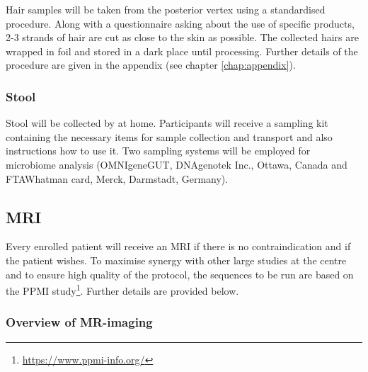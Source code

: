 Hair samples will be taken from the posterior vertex using a standardised procedure. Along with a questionnaire asking about the use of specific products, 2-3 strands of hair are cut as close to the skin as possible. The collected hairs are wrapped in foil and stored in a dark place until processing. Further details of the procedure are given in the appendix (see chapter \ref{chap:appendix}).

\subsubsection{Stool}
\label{biosamples:stool}
Stool will be collected by at home. Participants will receive a sampling kit containing the necessary items for sample collection and transport and also instructions how to use it. Two sampling systems will be employed for microbiome analysis (OMNIgeneGUT, DNAgenotek Inc., Ottawa, Canada and FTAWhatman card, Merck, Darmstadt, Germany). 

\subsection{\ac{MRI}}
\label{subsec:MRI}
Every enrolled patient will receive an \ac{MRI} if there is no contraindication and if the patient wishes. To maximise synergy with other large studies at the centre and to ensure high quality of the protocol, the sequences to be run are based on the PPMI study\footnote{\url{https://www.ppmi-info.org/}}. Further details are provided below.
\subsubsection{Overview of MR-imaging}

